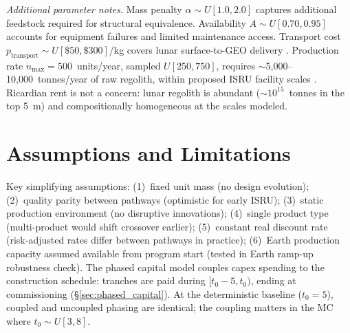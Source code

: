\documentclass[5p,twocolumn]{elsarticle}
\begin{document}
\begin{table}[htbp]
\centering
\caption{Empirical learning rates from analogous production programs. Our ranges $\mathrm{LR}_E \sim \mathcal{N}(0.85, 0.03)$ [0.75, 0.95] and $\mathrm{LR}_I \sim \mathcal{N}(0.90, 0.03)$ [0.80, 0.98] encompass these empirical values.}
\label{tab:empirical_lr}
\small
{}
\end{table}

\emph{Additional parameter notes.} Mass penalty $\alpha \sim U[1.0, 2.0]$ captures additional feedstock required for structural equivalence. Availability $A \sim U[0.70, 0.95]$ accounts for equipment failures and limited maintenance access. Transport cost $p_{\mathrm{transport}} \sim U[\$50, \$300]$/kg covers lunar surface-to-GEO delivery \cite{ishimatsu2016}. Production rate $\dot{n}_{\max} = 500$~units/year, sampled $U[250, 750]$, requires $\sim$5{,}000--10{,}000~tonnes/year of raw regolith, within proposed ISRU facility scales \cite{sanders2015}. Ricardian rent is not a concern: lunar regolith is abundant (${\sim}10^{15}$~tonnes in the top 5~m) and compositionally homogeneous at the scales modeled.

\section{Assumptions and Limitations}
\label{sec:appendix_assumptions}

Key simplifying assumptions: (1)~fixed unit mass (no design evolution); (2)~quality parity between pathways (optimistic for early ISRU); (3)~static production environment (no disruptive innovations); (4)~single product type (multi-product would shift crossover earlier); (5)~constant real discount rate (risk-adjusted rates differ between pathways in practice); (6)~Earth production capacity assumed available from program start (tested in Earth ramp-up robustness check). The phased capital model couples capex spending to the construction schedule: tranches are paid during $[t_0 - 5, t_0)$, ending at commissioning (\S\ref{sec:phased_capital}). At the deterministic baseline ($t_0 = 5$), coupled and uncoupled phasing are identical; the coupling matters in the MC where $t_0 \sim U[3,8]$.
\end{document}
